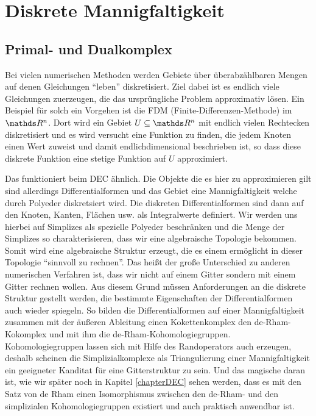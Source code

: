 \renewcommand{\d}{\mathrm{d}}

\chapter{Diskrete Mannigfaltigkeit}

\section{Primal- und Dualkomplex}
  
  \begin{ziel}
    Bei vielen numerischen Methoden werden Gebiete über überabzählbaren Mengen auf denen Gleichungen "`leben"' diskretisiert.
    Ziel dabei ist es endlich viele Gleichungen zuerzeugen, die das ursprüngliche Problem approximativ lösen.
    Ein Beispiel für solch ein Vorgehen ist die FDM (Finite-Differenzen-Methode) im \( \R^{n} \).
    Dort wird ein Gebiet \( U\subseteq\R^{n} \) mit endlich vielen Rechtecken diskretisiert 
    und es wird versucht eine Funktion zu finden, die jedem Knoten einen Wert zuweist und damit endlichdimensional beschrieben ist, so dass diese
    diskrete Funktion eine stetige Funktion auf \( U \) approximiert. 

    Das funktioniert beim DEC ähnlich. Die Objekte die es hier zu approximieren gilt sind allerdings Differentialformen und das Gebiet eine
    Mannigfaltigkeit welche durch Polyeder diskretsiert wird. Die diskreten Differentialformen sind dann auf den Knoten, Kanten, Flächen usw. als Integralwerte
    definiert. Wir werden uns hierbei auf Simplizes als spezielle Polyeder beschränken und die Menge der Simplizes so charakterisieren, dass wir
    eine algebraische Topologie bekommen. Somit wird eine algebraische Struktur erzeugt, die es einem ermöglicht in dieser Topologie
    "`sinnvoll zu rechnen"'.
    Das heißt der große Unterschied zu anderen numerischen Verfahren ist, dass wir nicht auf einem Gitter sondern mit einem Gitter rechnen wollen.
    Aus diesem Grund müssen Anforderungen an die diskrete Struktur gestellt werden, die bestimmte Eigenschaften der Differentialformen auch wieder spiegeln.
    So bilden die Differentialformen auf einer Mannigfaltigkeit zusammen mit der äußeren Ableitung einen Kokettenkomplex den de-Rham-Kokomplex und mit ihm die de-Rham-Kohomologiegruppen.
    Kohomologiegruppen lassen sich mit Hilfe des Randoperators auch erzeugen, deshalb scheinen die Simplizialkomplexe als Triangulierung einer Mannigfaltigkeit ein geeigneter Kanditat für
    eine Gitterstruktur zu sein.
    Und das magische daran ist, wie wir später noch in Kapitel \ref{chapterDEC} sehen werden, dass es mit den Satz von de Rham einen Isomorphismus zwischen den de-Rham- und den simplizialen
    Kohomologiegruppen existiert und auch praktisch anwendbar ist. 
  \end{ziel}

